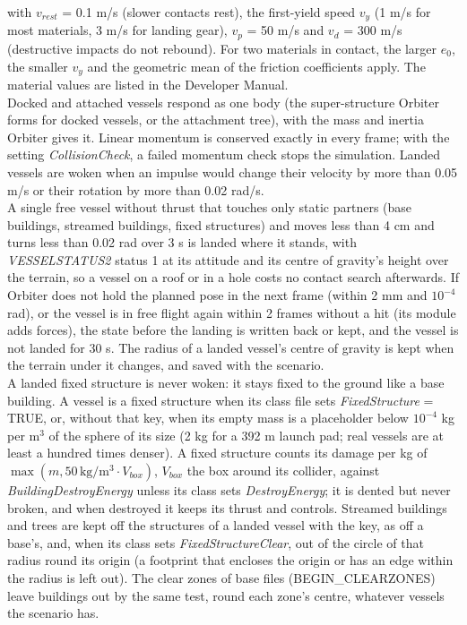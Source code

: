 \documentclass[Orbiter Technical Reference.tex]{subfiles}
\begin{document}
\noindent
with $v_{rest}$ = 0.1 m/s (slower contacts rest), the first-yield speed $v_{y}$ (1 m/s for most materials, 3 m/s for landing gear), $v_{p}$ = 50 m/s and $v_{d}$ = 300 m/s (destructive impacts do not rebound). For two materials in contact, the larger $e_{0}$, the smaller $v_{y}$ and the geometric mean of the friction coefficients apply. The material values are listed in the Developer Manual.\\
Docked and attached vessels respond as one body (the super-structure Orbiter forms for docked vessels, or the attachment tree), with the mass and inertia Orbiter gives it. Linear momentum is conserved exactly in every frame; with the setting \textit{CollisionCheck}, a failed momentum check stops the simulation. Landed vessels are woken when an impulse would change their velocity by more than 0.05 m/s or their rotation by more than 0.02 rad/s.\\
A single free vessel without thrust that touches only static partners (base buildings, streamed buildings, fixed structures) and moves less than 4 cm and turns less than 0.02 rad over 3 s is landed where it stands, with \textit{VESSELSTATUS2} status 1 at its attitude and its centre of gravity's height over the terrain, so a vessel on a roof or in a hole costs no contact search afterwards. If Orbiter does not hold the planned pose in the next frame (within 2 mm and $10^{-4}$ rad), or the vessel is in free flight again within 2 frames without a hit (its module adds forces), the state before the landing is written back or kept, and the vessel is not landed for 30 s. The radius of a landed vessel's centre of gravity is kept when the terrain under it changes, and saved with the scenario.\\
A landed fixed structure is never woken: it stays fixed to the ground like a base building. A vessel is a fixed structure when its class file sets \textit{FixedStructure} = TRUE, or, without that key, when its empty mass is a placeholder below $10^{-4}$ kg per m$^3$ of the sphere of its size (2 kg for a 392 m launch pad; real vessels are at least a hundred times denser). A fixed structure counts its damage per kg of $\max(m, 50\,\mathrm{kg/m^3}\cdot V_{box})$, $V_{box}$ the box around its collider, against \textit{BuildingDestroyEnergy} unless its class sets \textit{DestroyEnergy}; it is dented but never broken, and when destroyed it keeps its thrust and controls. Streamed buildings and trees are kept off the structures of a landed vessel with the key, as off a base's, and, when its class sets \textit{FixedStructureClear}, out of the circle of that radius round its origin (a footprint that encloses the origin or has an edge within the radius is left out). The clear zones of base files (BEGIN\_CLEARZONES) leave buildings out by the same test, round each zone's centre, whatever vessels the scenario has.\\
\end{document}
